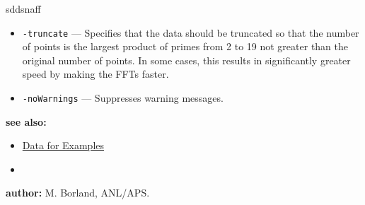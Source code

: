 \begin{sddsprog}{sddsnaff}
\begin{itemize}
        NAFF runs. SDDS output operations are performed serially. The default is 1.
      \item \verb|-truncate| --- Specifies that the data should be truncated so that the number of
        points is the largest product of primes from 2 to 19 not greater than the original number of
        points. In some cases, this results in significantly greater speed by making the FFTs faster.
      \item \verb|-noWarnings| --- Suppresses warning messages.
    \end{itemize}
  \item \textbf{see also:}
    \begin{itemize}
      \item \hyperref[exampleData]{Data for Examples}
      \item {}
    \end{itemize}
  \item \textbf{author:} M. Borland, ANL/APS.
\end{sddsprog}
